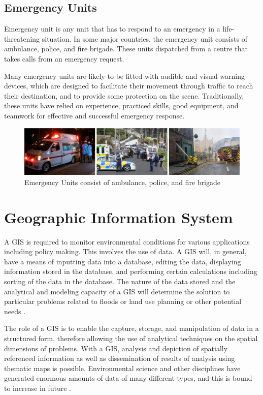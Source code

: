 \pagebreak
\subsection{Emergency Units}
Emergency unit is any unit that has to respond to an emergency in a life-threatening situation. In some major countries, the emergency unit consists of ambulance, police, and fire brigade. These units dispatched from a centre that takes calls from an emergency request. 

Many emergency units are likely to be fitted with audible and visual warning devices, which are designed to facilitate their movement through traffic to reach their destination, and to provide some protection on the scene. Traditionally, these units have relied on experience, practiced skills, good equipment, and teamwork for effective and successful emergency response.

\begin{figure}[H]
    \centering
    \includegraphics[scale=0.6]{emergency-units.png}
    \caption{Emergency Units consist of ambulance, police, and fire brigade}
    \label{fig:emergency-units}
\end{figure}

\section{Geographic Information System}
A GIS is required to monitor environmental conditions for various applications including policy making. This involves the use of data. A GIS will, in general, have a means of inputting data into a database, editing the data, displaying information stored in the database, and performing certain calculations including sorting of the data in the database. The nature of the data stored and the analytical and modeling capacity of a GIS will determine the solution to particular problems related to floods or land use planning or other potential needs \cite{ondieki1997}.

The role of a GIS is to enable the capture, storage, and manipulation of data in a structured form, therefore allowing the use of analytical techniques on the spatial dimensions of problems. With a GIS, analysis and depiction of spatially referenced information as well as dissemination of results of analysis using thematic maps is possible. Environmental science and other disciplines have generated enormous amounts of data of many different types, and this is bound to increase in future \cite{raju1997}.

